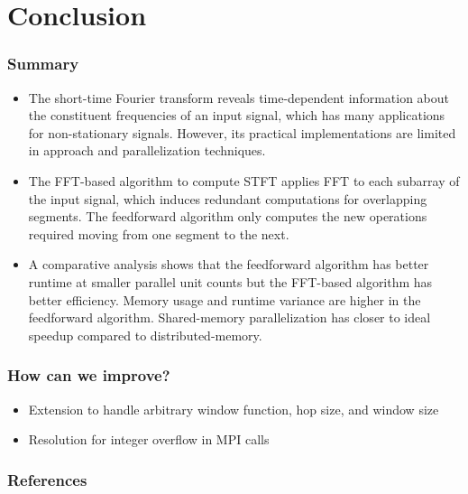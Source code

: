 \documentclass[8pt]{beamer}
\begin{document}
\section{Conclusion}
\begin{frame}
\frametitle{Summary}
\begin{itemize}
    \item The short-time Fourier transform reveals time-dependent information
    about the constituent frequencies of an input signal, which has many
    applications for non-stationary signals. However, its practical
    implementations are limited in approach and parallelization techniques.
    \item The FFT-based algorithm to compute STFT applies FFT to each subarray
    of the input signal, which induces redundant computations for overlapping
    segments. The feedforward algorithm only computes the new operations
    required moving from one segment to the next.
    \item A comparative analysis shows that the feedforward algorithm has better
    runtime at smaller parallel unit counts but the FFT-based algorithm has
    better efficiency. Memory usage and runtime variance are higher in the 
    feedforward algorithm. Shared-memory parallelization has closer to ideal
    speedup compared to distributed-memory.
\end{itemize}
\end{frame}

\begin{frame}
\frametitle{How can we improve?}
\begin{itemize}
    \item Extension to handle arbitrary window function, hop size, and window size
    \item Resolution for integer overflow in MPI calls
\end{itemize}

\end{frame}

\begin{frame}[t, allowframebreaks]
\frametitle{References}
\printbibliography[heading=none]
\end{frame}
\end{document}
